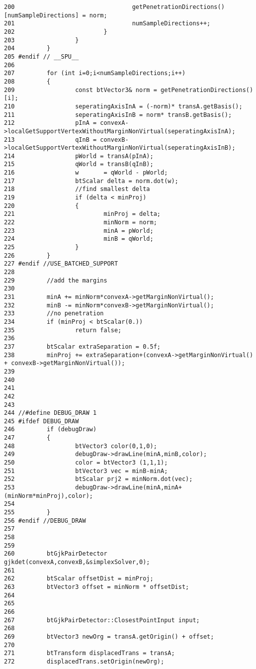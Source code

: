 \begin{Code}
\begin{verbatim}
200                                 getPenetrationDirections()[numSampleDirections] = norm;
201                                 numSampleDirections++;
202                         }
203                 }
204         }
205 #endif // __SPU__
206 
207         for (int i=0;i<numSampleDirections;i++)
208         {
209                 const btVector3& norm = getPenetrationDirections()[i];
210                 seperatingAxisInA = (-norm)* transA.getBasis();
211                 seperatingAxisInB = norm* transB.getBasis();
212                 pInA = convexA->localGetSupportVertexWithoutMarginNonVirtual(seperatingAxisInA);
213                 qInB = convexB->localGetSupportVertexWithoutMarginNonVirtual(seperatingAxisInB);
214                 pWorld = transA(pInA);  
215                 qWorld = transB(qInB);
216                 w       = qWorld - pWorld;
217                 btScalar delta = norm.dot(w);
218                 //find smallest delta
219                 if (delta < minProj)
220                 {
221                         minProj = delta;
222                         minNorm = norm;
223                         minA = pWorld;
224                         minB = qWorld;
225                 }
226         }
227 #endif //USE_BATCHED_SUPPORT
228 
229         //add the margins
230 
231         minA += minNorm*convexA->getMarginNonVirtual();
232         minB -= minNorm*convexB->getMarginNonVirtual();
233         //no penetration
234         if (minProj < btScalar(0.))
235                 return false;
236 
237         btScalar extraSeparation = 0.5f;
238         minProj += extraSeparation+(convexA->getMarginNonVirtual() + convexB->getMarginNonVirtual());
239 
240 
241 
242 
243 
244 //#define DEBUG_DRAW 1
245 #ifdef DEBUG_DRAW
246         if (debugDraw)
247         {
248                 btVector3 color(0,1,0);
249                 debugDraw->drawLine(minA,minB,color);
250                 color = btVector3 (1,1,1);
251                 btVector3 vec = minB-minA;
252                 btScalar prj2 = minNorm.dot(vec);
253                 debugDraw->drawLine(minA,minA+(minNorm*minProj),color);
254 
255         }
256 #endif //DEBUG_DRAW
257 
258         
259 
260         btGjkPairDetector gjkdet(convexA,convexB,&simplexSolver,0);
261 
262         btScalar offsetDist = minProj;
263         btVector3 offset = minNorm * offsetDist;
264         
265 
266 
267         btGjkPairDetector::ClosestPointInput input;
268                 
269         btVector3 newOrg = transA.getOrigin() + offset;
270 
271         btTransform displacedTrans = transA;
272         displacedTrans.setOrigin(newOrg);

\end{verbatim}
\end{Code}

